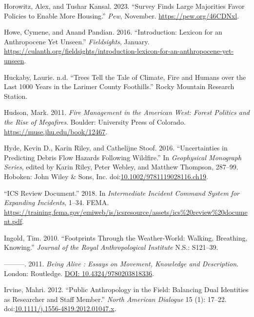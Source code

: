 \documentclass[
]{article}
\newlength{\cslhangindent}
\newenvironment{CSLReferences}[2] %
 {\begin{list}{}{%
  \setlength{\itemindent}{0pt}
  \setlength{\leftmargin}{0pt}
  \setlength{\parsep}{0pt}
  \ifodd #1
   \setlength{\leftmargin}{\cslhangindent}
   \setlength{\itemindent}{-1\cslhangindent}
  \fi
  \setlength{\itemsep}{#2\baselineskip}}}
 {\end{list}}
\begin{document}
\begin{CSLReferences}{1}{0}
Horowitz, Alex, and Tushar Kansal. 2023. {``Survey {Finds Large Majorities Favor Policies} to {Enable More Housing}.''} \emph{Pew}, November. \url{https://pew.org/46CDNxl}.

Howe, Cymene, and Anand Pandian. 2016. {``Introduction: {Lexicon} for an {Anthropocene Yet Unseen}.''} \emph{Fieldsights}, January. \url{https://culanth.org/fieldsights/introduction-lexicon-for-an-anthropocene-yet-unseen}.

Huckaby, Laurie. n.d. {``Trees Tell the Tale of Climate, Fire and Humans over the Last 1000 Years in the {Larimer County} Foothills.''} Rocky Mountain Research Station.

Hudson, Mark. 2011. \emph{Fire {Management} in the {American West}: {Forest Politics} and the {Rise} of {Megafires}}. Boulder: University Press of Colorado. \url{https://muse.jhu.edu/book/12467}.

Hyde, Kevin D., Karin Riley, and Cathelijne Stoof. 2016. {``Uncertainties in {Predicting Debris Flow Hazards Following Wildfire}.''} In \emph{Geophysical {Monograph Series}}, edited by Karin Riley, Peter Webley, and Matthew Thompson, 287--99. Hoboken: John Wiley \& Sons, Inc. doi:\href{https://doi.org/10.1002/9781119028116.ch19}{10.1002/9781119028116.ch19}.

{``{ICS Review Document}.''} 2018. In \emph{Intermediate {Incident Command System} for {Expanding Incidents}}, 1--34. FEMA. \url{https://training.fema.gov/emiweb/is/icsresource/assets/ics\%20review\%20document.pdf}.

Ingold, Tim. 2010. {``Footprints Through the Weather-World: Walking, Breathing, Knowing.''} \emph{Journal of the Royal Anthropological Institute} N.S.: S121--39.

---------. 2011. \emph{Being {Alive} : {Essays} on {Movement}, {Knowledge} and {Description}}. London: Routledge. \href{https://DOI:\%2010.4324/9780203818336}{DOI: 10.4324/9780203818336}.

Irvine, Mahri. 2012. {``Public {Anthropology} in the {Field}: {Balancing Dual Identities} as {Researcher} and {Staff Member}.''} \emph{North American Dialogue} 15 (1): 17--22. doi:\href{https://doi.org/10.1111/j.1556-4819.2012.01047.x}{10.1111/j.1556-4819.2012.01047.x}.


\end{CSLReferences}
\end{document}
